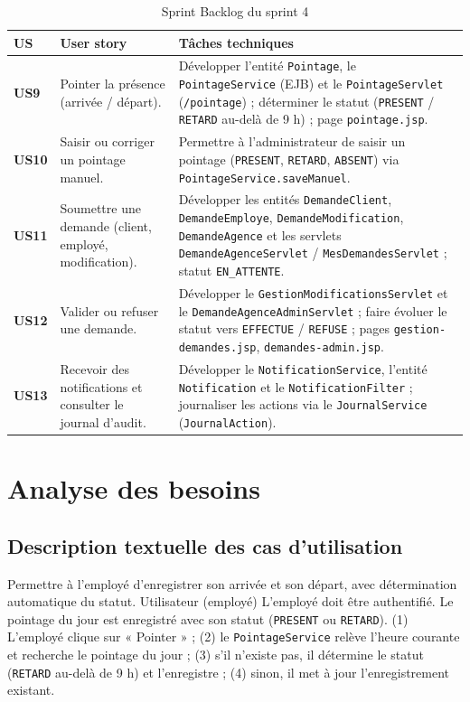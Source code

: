 \begin{table}[htbp]
\centering
\caption{Sprint Backlog du sprint 4}
\label{tab:bl_s4}
\renewcommand{\arraystretch}{1.3}
\begin{tabularx}{\textwidth}{>{\bfseries}p{1cm}p{5cm}X}
\toprule
\textmd{\textbf{US}} & \textbf{User story} & \textbf{Tâches techniques}\\
\midrule
US9 & Pointer la présence (arrivée / départ). &
Développer l'entité \texttt{Pointage}, le \texttt{PointageService} (EJB) et le
\texttt{PointageServlet} (\texttt{/pointage}) ; déterminer le statut
(\texttt{PRESENT} / \texttt{RETARD} au-delà de 9 h) ; page \texttt{pointage.jsp}.\\
\midrule
US10 & Saisir ou corriger un pointage manuel. &
Permettre à l'administrateur de saisir un pointage (\texttt{PRESENT},
\texttt{RETARD}, \texttt{ABSENT}) via \texttt{PointageService.saveManuel}.\\
\midrule
US11 & Soumettre une demande (client, employé, modification). &
Développer les entités \texttt{DemandeClient}, \texttt{DemandeEmploye},
\texttt{DemandeModification}, \texttt{DemandeAgence} et les servlets
\texttt{DemandeAgenceServlet} / \texttt{MesDemandesServlet} ; statut
\texttt{EN\_ATTENTE}.\\
\midrule
US12 & Valider ou refuser une demande. &
Développer le \texttt{GestionModificationsServlet} et le
\texttt{DemandeAgenceAdminServlet} ; faire évoluer le statut vers
\texttt{EFFECTUE} / \texttt{REFUSE} ; pages \texttt{gestion-demandes.jsp},
\texttt{demandes-admin.jsp}.\\
\midrule
US13 & Recevoir des notifications et consulter le journal d'audit. &
Développer le \texttt{NotificationService}, l'entité \texttt{Notification} et le
\texttt{NotificationFilter} ; journaliser les actions via le
\texttt{JournalService} (\texttt{JournalAction}).\\
\bottomrule
\end{tabularx}
\end{table}

\section{Analyse des besoins}

\subsection{Description textuelle des cas d'utilisation}

{Permettre à l'employé d'enregistrer son arrivée et son départ, avec
détermination automatique du statut.}
{Utilisateur (employé)}
{L'employé doit être authentifié.}
{Le pointage du jour est enregistré avec son statut (\texttt{PRESENT} ou
\texttt{RETARD}).}
{(1) L'employé clique sur « Pointer » ; (2) le \texttt{PointageService} relève
l'heure courante et recherche le pointage du jour ; (3) s'il n'existe pas, il
détermine le statut (\texttt{RETARD} au-delà de 9 h) et l'enregistre ; (4) sinon,
il met à jour l'enregistrement existant.}


